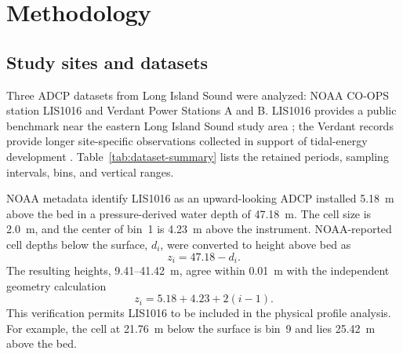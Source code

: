 \documentclass[12pt,sort&compress]{elsarticle}
\begin{document}
\section{Methodology}
\label{sec:methodology}

\subsection{Study sites and datasets}
\label{subsec:datasets}

Three ADCP datasets from Long Island Sound were analyzed: NOAA CO-OPS station LIS1016 and Verdant Power Stations A and B. LIS1016 provides a public benchmark near the eastern Long Island Sound study area \cite{coops_map}; the Verdant records provide longer site-specific observations collected in support of tidal-energy development \cite{husoVP2026}. Table~\ref{tab:dataset-summary} lists the retained periods, sampling intervals, bins, and vertical ranges.

\begin{table}[tbp]
\centering
\caption{Datasets retained for the comparative analysis. HAB denotes height above bed.}
\label{tab:dataset-summary}
\end{table}

NOAA metadata identify LIS1016 as an upward-looking ADCP installed 5.18~m above the bed in a pressure-derived water depth of 47.18~m. The cell size is 2.0~m, and the center of bin~1 is 4.23~m above the instrument. NOAA-reported cell depths below the surface, $d_i$, were converted to height above bed as
\begin{equation}
 z_i=47.18-d_i.
 \label{eq:coops-height}
\end{equation}
The resulting heights, 9.41--41.42~m, agree within 0.01~m with the independent geometry calculation
\begin{equation}
 z_i=5.18+4.23+2(i-1).
 \label{eq:coops-geometry}
\end{equation}
This verification permits LIS1016 to be included in the physical profile analysis. For example, the cell at 21.76~m below the surface is bin~9 and lies 25.42~m above the bed.
\end{document}
